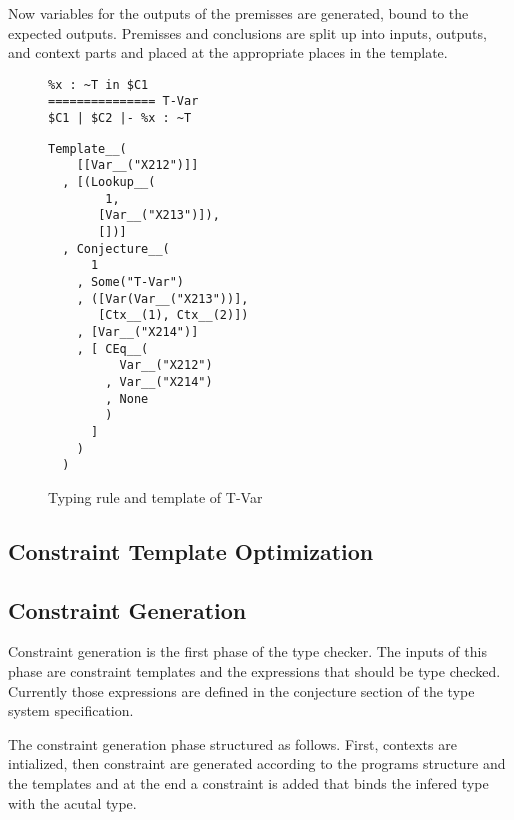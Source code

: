 Now variables for the outputs of the premisses are generated, bound to
the expected outputs. Premisses and conclusions are split up into
inputs, outputs, and context parts and placed at the appropriate
places in the template.

\begin{figure}
  \centering
  \begin{minipage}{.45\linewidth}
\begin{verbatim}
%x : ~T in $C1
=============== T-Var
$C1 | $C2 |- %x : ~T
\end{verbatim}
  \end{minipage}
  \begin{minipage}{.45\linewidth}
\begin{verbatim}
Template__(
    [[Var__("X212")]]
  , [(Lookup__(
        1,
       [Var__("X213")]),
       [])]
  , Conjecture__(
      1
    , Some("T-Var")
    , ([Var(Var__("X213"))],
       [Ctx__(1), Ctx__(2)])
    , [Var__("X214")]
    , [ CEq__(
          Var__("X212")
        , Var__("X214")
        , None
        )
      ]
    )
  )
\end{verbatim}
  \end{minipage}
  \caption{Typing rule and template of T-Var}
  \label{fig:template-example}
\end{figure}
\subsection{Constraint Template Optimization}
\label{sec:constr-templ-optim}
\subsection{Constraint Generation}
\label{sec:constr-gener}
Constraint generation is the first phase of the type checker. The
inputs of this phase are constraint templates and the expressions that
should be type checked. Currently those expressions are defined in the
conjecture section of the type system specification. 

The constraint generation phase structured as follows. First, contexts
are intialized, then constraint are generated according to the
programs structure and the templates and at the end a constraint is
added that binds the infered type with the acutal type.


